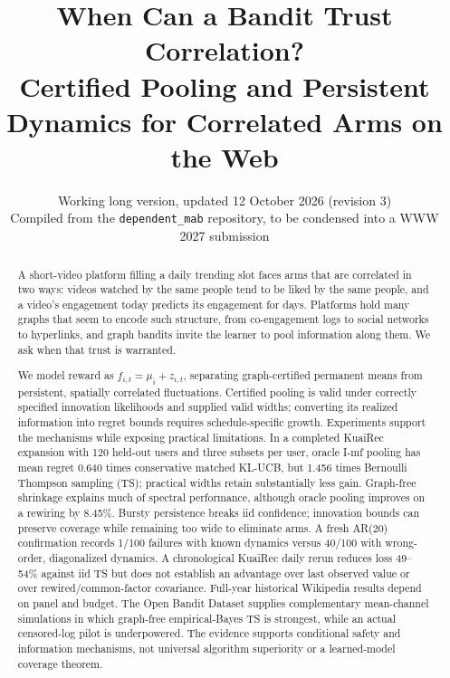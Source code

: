 \documentclass[11pt]{article}
\title{When Can a Bandit Trust Correlation?\\[2pt]
\large Certified Pooling and Persistent Dynamics for Correlated Arms on the Web}
\author{Working long version, updated 12 October 2026 (revision 3)\\
\small Compiled from the \texttt{dependent\_mab} repository, to be condensed into a WWW 2027 submission}
\date{}
\theoremstyle{definition}
\theoremstyle{remark}
\begin{document}
\maketitle

\begin{abstract}
A short-video platform filling a daily trending slot faces arms that are correlated in two ways: videos watched by the same people tend to be liked by the same people, and a video's engagement today predicts its engagement for days. Platforms hold many graphs that seem to encode such structure, from co-engagement logs to social networks to hyperlinks, and graph bandits invite the learner to pool information along them. We ask when that trust is warranted.

We model reward as $f_{i,t}=\mu_i+z_{i,t}$, separating graph-certified permanent means from persistent, spatially correlated fluctuations. Certified pooling is valid under correctly specified innovation likelihoods and supplied valid widths; converting its realized information into regret bounds requires schedule-specific growth. Experiments support the mechanisms while exposing practical limitations. In a completed KuaiRec expansion with 120 held-out users and three subsets per user, oracle I-mf pooling has mean regret 0.640 times conservative matched KL-UCB, but 1.456 times Bernoulli Thompson sampling (TS); practical widths retain substantially less gain. Graph-free shrinkage explains much of spectral performance, although oracle pooling improves on a rewiring by 8.45\%. Bursty persistence breaks iid confidence; innovation bounds can preserve coverage while remaining too wide to eliminate arms. A fresh AR(20) confirmation records 1/100 failures with known dynamics versus 40/100 with wrong-order, diagonalized dynamics. A chronological KuaiRec daily rerun reduces loss 49--54\% against iid TS but does not establish an advantage over last observed value or over rewired/common-factor covariance. Full-year historical Wikipedia results depend on panel and budget. The Open Bandit Dataset supplies complementary mean-channel simulations in which graph-free empirical-Bayes TS is strongest, while an actual censored-log pilot is underpowered. The evidence supports conditional safety and information mechanisms, not universal algorithm superiority or a learned-model coverage theorem.
\end{abstract}

\tableofcontents
\newpage

\end{document}
